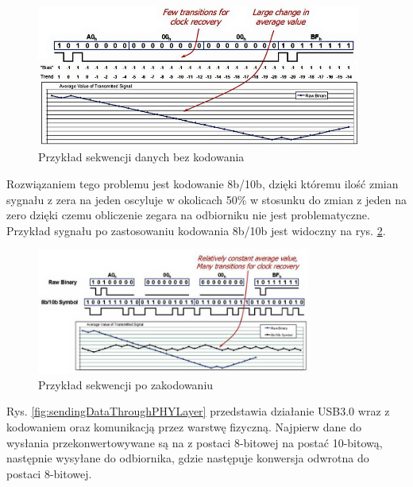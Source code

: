 \documentclass{BscUS}
\begin{document}
\begin{figure}[H]
\centering
\includegraphics[width=0.95\textwidth]{./img/withoutEncoding}
\caption{Przykład sekwencji danych bez kodowania \cite{withoutEncoding}}
\label{fig:withoutEncoding}
\end{figure}
\noindent Rozwiązaniem tego problemu jest kodowanie 8b/10b, dzięki któremu ilość zmian sygnału z zera na jeden oscyluje w okolicach 50\% w stosunku do zmian z jeden na zero dzięki czemu obliczenie zegara na odbiorniku nie jest problematyczne. Przykład sygnału po zastosowaniu kodowania 8b/10b jest widoczny na rys. \ref{fig:withEncoding}.
\begin{figure}[H]
\centering
\includegraphics[width=0.8\textwidth]{./img/withEncoding}
\caption{Przykład sekwencji po zakodowaniu \cite{withEncoding}}
\label{fig:withEncoding}
\end{figure}
Rys. \ref{fig:sendingDataThroughPHYLayer} przedstawia działanie USB3.0 wraz z kodowaniem oraz komunikacją przez warstwę fizyczną. Najpierw dane do wysłania przekonwertowywane są na z postaci 8-bitowej na postać 10-bitową, następnie wysyłane do odbiornika, gdzie następuje konwersja odwrotna do postaci 8-bitowej.
\end{document}
